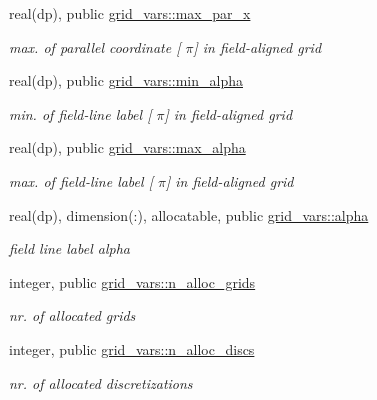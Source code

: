 \begin{DoxyCompactItemize}
real(dp), public \hyperlink{namespacegrid__vars_acaa1fd21d0c728ad8f24591c0d2a5801}{grid\+\_\+vars\+::max\+\_\+par\+\_\+x}
\begin{DoxyCompactList}\small\item\em max. of parallel coordinate \mbox{[} $\pi$\mbox{]} in field-\/aligned grid \end{DoxyCompactList}\item 
real(dp), public \hyperlink{namespacegrid__vars_ad6f74227054278479670c68d8950e0e2}{grid\+\_\+vars\+::min\+\_\+alpha}
\begin{DoxyCompactList}\small\item\em min. of field-\/line label \mbox{[} $\pi$\mbox{]} in field-\/aligned grid \end{DoxyCompactList}\item 
real(dp), public \hyperlink{namespacegrid__vars_ad3cab5cd1037b6956ccf74cde4539298}{grid\+\_\+vars\+::max\+\_\+alpha}
\begin{DoxyCompactList}\small\item\em max. of field-\/line label \mbox{[} $\pi$\mbox{]} in field-\/aligned grid \end{DoxyCompactList}\item 
real(dp), dimension(\+:), allocatable, public \hyperlink{namespacegrid__vars_a07bf4730be1d5ab8b42f85be63e11797}{grid\+\_\+vars\+::alpha}
\begin{DoxyCompactList}\small\item\em field line label alpha \end{DoxyCompactList}\item 
integer, public \hyperlink{namespacegrid__vars_ac4b43443d16af06fdc62d542b3eadee2}{grid\+\_\+vars\+::n\+\_\+alloc\+\_\+grids}
\begin{DoxyCompactList}\small\item\em nr. of allocated grids \end{DoxyCompactList}\item 
integer, public \hyperlink{namespacegrid__vars_a23b5e4789dc5d3d0d6dadeb47909ddbd}{grid\+\_\+vars\+::n\+\_\+alloc\+\_\+discs}
\begin{DoxyCompactList}\small\item\em nr. of allocated discretizations \end{DoxyCompactList}\end{DoxyCompactItemize}
